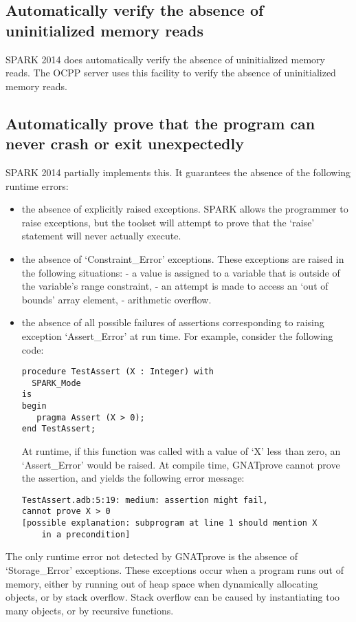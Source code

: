 \documentclass[12pt,openany,a4paper]{book}
\begin{document}
\subsection{Automatically verify the absence of uninitialized memory reads}
SPARK 2014 does automatically verify the absence of uninitialized memory reads. The OCPP server uses this facility to verify the absence of uninitialized memory reads.

\subsection{Automatically prove that the program can never crash or exit unexpectedly}
SPARK 2014 partially implements this. It guarantees the absence of the following runtime errors:
\begin{itemize}
	\item the absence of explicitly raised exceptions. SPARK allows the programmer to raise exceptions, but the toolset will attempt to prove that the `raise' statement will never actually execute.
	\item the absence of `Constraint\_Error' exceptions. These exceptions are raised in the following situations:
		\subitem - a value is assigned to a variable that is outside of the variable's range constraint,
		\subitem - an attempt is made to access an `out of bounds' array element,
		\subitem - arithmetic overflow.
	
	\item the absence of all possible failures of assertions corresponding to raising exception `Assert\_Error' at run time. For example, consider the following code:
\begin{verbatim}
procedure TestAssert (X : Integer) with
  SPARK_Mode
is
begin
   pragma Assert (X > 0);
end TestAssert;
\end{verbatim}

At runtime, if this function was called with a value of `X' less than zero, an `Assert\_Error' would be raised. At compile time, GNATprove cannot prove the assertion, and yields the following error message:
\begin{verbatim}
TestAssert.adb:5:19: medium: assertion might fail, 
cannot prove X > 0 
[possible explanation: subprogram at line 1 should mention X 
	in a precondition]
\end{verbatim}
\end{itemize}

The only runtime error not detected by GNATprove is the absence of `Storage\_Error' exceptions. These exceptions occur when a program runs out of memory, either by running out of heap space when dynamically allocating objects, or by stack overflow. Stack overflow can be caused by instantiating too many objects, or by recursive functions. 
	
\end{document}
